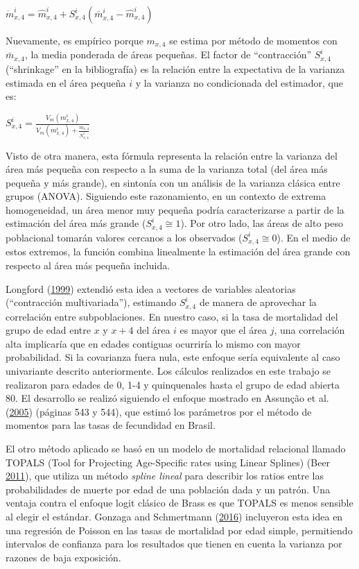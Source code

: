 \documentclass[12pt,]{article}
\begin{document}
\(\mathring{m}_{x,4}^{i}=\hat{m}_{x, 4}^{i}+S_{x,4}^{i}(\bar{m}_{x,4}^{i}-\hat{m}_{x,4}^{i})\)

Nuevamente, es empírico porque \(m_{x,4}\) se estima por método de
momentos con \(\bar{m}_{x,4}\), la media ponderada de áreas pequeñas. El
factor de ``contracción'' \(S_{x, 4}^{i}\) (``shrinkage'' en la
bibliografía) es la relación entre la expectativa de la varianza
estimada en el área pequeña \(i\) y la varianza no condicionada del
estimador, que es:

\(S_{x,4}^{i}=\frac{V_{m}(m_{x,4}^{i})}{V_{m}(m_{x,4}^{i})+\frac{m_{x,4}}{N_{x,4}^{i}}}\)

Visto de otra manera, esta fórmula representa la relación entre la
varianza del área más pequeña con respecto a la suma de la varianza
total (del área más pequeña y más grande), en sintonía con un análisis
de la varianza clásica entre grupos (ANOVA). Siguiendo este
razonamiento, en un contexto de extrema homogeneidad, un área menor muy
pequeña podría caracterizarse a partir de la estimación del área más
grande (\(S_{x, 4} ^ {i} \cong 1\)). Por otro lado, las áreas de alto
peso poblacional tomarán valores cercanos a los observados
(\(S_{x,4}^{i}\cong 0\)). En el medio de estos extremos, la función
combina linealmente la estimación del área grande con respecto al área
más pequeña incluida.

Longford (\protect\hyperlink{ref-Longford1999}{1999}) extendió esta idea
a vectores de variables aleatorias (``contracción multivariada''),
estimando \(S_{x,4}^{i}\) de manera de aprovechar la correlación entre
subpoblaciones. En nuestro caso, si la tasa de mortalidad del grupo de
edad entre \(x\) y \(x+4\) del área \(i\) es mayor que el área \(j\),
una correlación alta implicaría que en edades contiguas ocurriría lo
mismo con mayor probabilidad. Si la covarianza fuera nula, este enfoque
sería equivalente al caso univariante descrito anteriormente. Los
cálculos realizados en este trabajo se realizaron para edades de 0, 1-4
y quinquenales hasta el grupo de edad abierta 80. El desarrollo se
realizó siguiendo el enfoque mostrado en Assunção et al.
(\protect\hyperlink{ref-Assuncao2005}{2005}) (páginas 543 y 544), que
estimó los parámetros por el método de momentos para las tasas de
fecundidad en Brasil.

El otro método aplicado se basó en un modelo de mortalidad relacional
llamado TOPALS (Tool for Projecting Age-Specific rates using Linear
Splines) (Beer \protect\hyperlink{ref-deBeer2011}{2011}), que utiliza un
método \emph{spline lineal} para describir los ratios entre las
probabilidades de muerte por edad de una población dada y un patrón. Una
ventaja contra el enfoque logit clásico de Brass es que TOPALS es menos
sensible al elegir el estándar. Gonzaga and Schmertmann
(\protect\hyperlink{ref-Gonzaga_Schmertmann_2016}{2016}) incluyeron esta
idea en una regresión de Poisson en las tasas de mortalidad por edad
simple, permitiendo intervalos de confianza para los resultados que
tienen en cuenta la varianza por razones de baja exposición.
\end{document}

